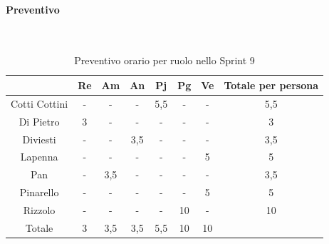 \documentclass{article}
\begin{document}
                \paragraph{Preventivo}\mbox{}\\
                \begin{table}[H]
                    \centering
                    \begin{tabular}{|c|c|c|c|c|c|c|c|}
                    \hline
                                  & Re  & Am  & An  & Pj  & Pg  & Ve  & Totale per persona \\ \hline
                    Cotti Cottini & -   & -   & -   & 5,5 & -   & -   & 5,5                \\ \hline
                    Di Pietro     & 3   & -   & -   & -   & -   & -   & 3                  \\ \hline
                    Diviesti      & -   & -   & 3,5 & -   & -   & -   & 3,5                \\ \hline
                    Lapenna       & -   & -   & -   & -   & -   & 5   & 5                  \\ \hline
                    Pan           & -   & 3,5 & -   & -   & -   & -   & 3,5                \\ \hline
                    Pinarello     & -   & -   & -   & -   & -   & 5   & 5                  \\ \hline
                    Rizzolo       & -   & -   & -   & -   & 10  & -   & 10                 \\ \hline
                    Totale        & 3   & 3,5 & 3,5 & 5,5 & 10  & 10  &                    \\ \hline
                    \end{tabular}
                    \caption{Preventivo orario per ruolo nello Sprint 9}
                \end{table}

\end{document}
